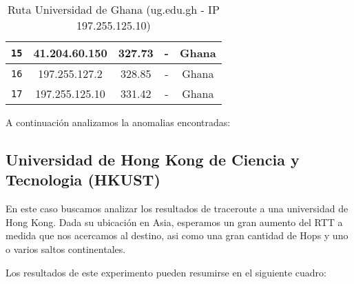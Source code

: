 \begin{table}[ht]
\begin{center}
\begin{tabular}{|c|c|c|c|c|}
    \texttt{15} & 41.204.60.150   & 327.73            & -                          & Ghana                          \\ \hline
    \texttt{16} & 197.255.127.2   & 328.85            & -                          & Ghana                          \\ \hline
    \texttt{17} & 197.255.125.10  & 331.42            & -                          & Ghana                          \\ \hline
    \end{tabular}
    \caption{Ruta Universidad de Ghana (ug.edu.gh  - IP 197.255.125.10)}
\end{center}
\end{table}

A continuación analizamos la anomalias encontradas:


\begin{figure}[H]
    \centering
\end{figure}


\subsection{Universidad de Hong Kong de Ciencia y Tecnologia (HKUST)}

En este caso buscamos analizar los resultados de traceroute a una universidad de Hong Kong. Dada su ubicación en Asia, esperamos un gran aumento del RTT a medida que nos acercamos al destino, asi como una gran cantidad de Hops y uno o varios saltos continentales.

Los resultados de este experimento pueden resumirse en el siguiente cuadro:

